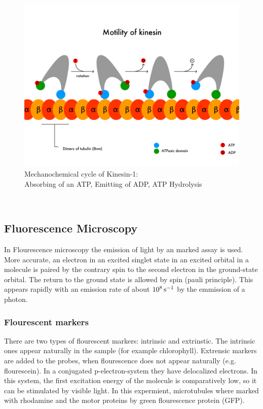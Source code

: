 		\begin{figure}[h]
				 			\centering
				 		   	\captionsetup{justification=centering}            
				 		    	  \includegraphics[scale=0.3]{pic/kinesin.png}
				 		    \caption{Mechanochemical cycle of Kinesin-1:\\ Absorbing of an ATP, Emitting of ADP, ATP Hydrolysis\cite{wikiKinesin}}
				 		   	\label{int:kinesin} 
				\end{figure}\\
	\subsection{Fluorescence Microscopy}
       In Flourescence microscopy the emission of light by an marked assay is used. More accurate, an electron in an excited singlet state in an excited orbital in a molecule is paired by the contrary spin to the second electron in the ground-state orbital. The return to the ground state is allowed by spin (pauli principle). This appears rapidly with an emission rate of about $\unit[10^8]{s^{-1}}$ by the emmission of a photon.
        \subsubsection{Flourescent markers}
            There are two types of flourescent markers: intrinsic and extrinstic. The intrinsic ones appear naturally in the sample (for example chlorophyll). Extrensic markers are added to the probes, when flourescence does not appear naturally (e.g. flourescein).
            In a conjugated p-electron-system they have delocalized electrons. In this system, the first excitation energy of the molecule is comparatively low, so it can be stimulated by visible light.
            In this expermient, microtubules where marked with rhodamine and the motor proteins by green flourescence protein (GFP).
